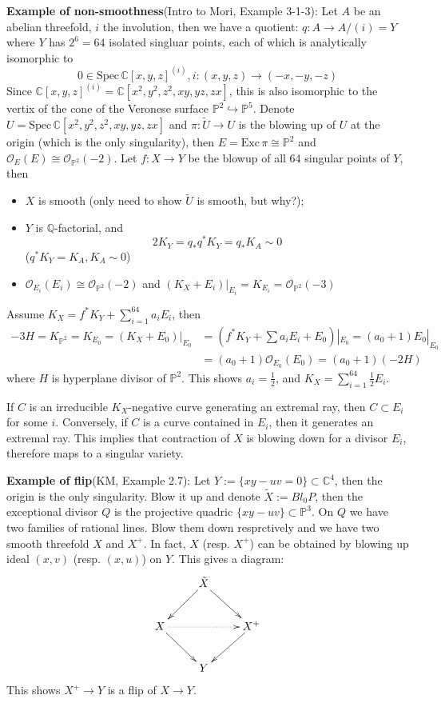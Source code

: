 \documentclass{article}
\begin{document}
\textbf{Example of non-smoothness}(Intro to Mori, Example 3-1-3): Let $ A $ be an abelian threefold, $ i $ the involution, then we have a quotient: $ q:A\to A/(i)=Y $ where $ Y $ has $ 2^6=64 $ isolated singluar points, each of which is analytically isomorphic to 
$$ 0\in \mathrm{Spec}\,\mathbb{C}[x,y,z]^{(i)}, i:(x,y,z)\to (-x,-y,-z) $$
Since $ \mathbb{C}[x,y,z]^{(i)}=\mathbb{C}[x^2,y^2,z^2,xy,yz,zx] $, this is also isomorphic to the vertix of the cone of the Veronese surface $ \mathbb{P}^2 \hookrightarrow \mathbb{P}^5$. Denote $ U=\mathrm{Spec}\,\mathbb{C}[x^2,y^2,z^2,xy,yz,zx] $ and $ \pi:\tilde{U}\to U $ is the blowing up of $ U $ at the origin (which is the only singularity), then $ E=\mathrm{Exc}\,\pi\cong \mathbb{P}^2 $ and $ \mathcal{O}_E(E)\cong \mathcal{O}_{\mathbb{P}^2}(-2) $. Let $ f:X\to Y $ be the blowup of all $ 64 $ singular points of $ Y $, then
\begin{itemize}
	\item $ X $ is smooth (only need to show $ \tilde{U} $ is smooth, but why?);
	\item $ Y $ is $ \mathbb{Q} $-factorial, and 
	$$ 2K_Y=q_*q^*K_Y=q_*K_A\sim 0$$
	($ q^*K_Y=K_A,K_A\sim 0 $)
	\item $ \mathcal{O}_{E_i}(E_i)\cong \mathcal{O}_{\mathbb{P}^2}(-2) $ and $ (K_X+E_i)|_{E_i}=K_{E_i}=\mathcal{O}_{\mathbb{P}^2}(-3) $
\end{itemize}
Assume $ K_X=f^*K_Y+\sum_{i=1}^{64}a_iE_i $, then 
\begin{equation*}
\begin{aligned}
-3H=K_{\mathbb{P}^2}=K_{E_0}=(K_X+E_0)|_{E_0}&=(f^*K_Y+\sum a_iE_i+E_0)|_{E_0}=(a_0+1)E_0|_{E_0}\\
&=(a_0+1)\mathcal{O}_{E_0}(E_0)=(a_0+1)(-2H)
\end{aligned}
\end{equation*}
 where $ H $ is hyperplane divisor of $ \mathbb{P}^2 $. This shows $ a_i =\frac{1}{2}$, and $ K_X=\sum_{i=1}^{64}\frac{1}{2}E_i $. 
 
If $ C $ is an irreducible $ K_X $-negative curve generating an extremal ray, then $ C\subset E_i $ for some $ i $. Conversely, if $ C $ is a curve contained in $ E_i $, then it generates an extremal ray. This implies that contraction of $ X $ is blowing down for a divisor $ E_i $, therefore maps to a singular variety.



\textbf{Example of flip}(KM, Example 2.7): Let $ Y:=\{ xy-uv=0 \}\subset \mathbb{C}^4 $, then the origin is the only singularity. Blow it up and denote $ \tilde{X}:=Bl_0P $, then the exceptional divisor $ Q $ is the projective quadric $ \{ xy-uv \}\subset \mathbb{P}^3 $. On $ Q $ we have two families of rational lines. Blow them down resprctively and we have two smooth threefold $ X $ and $ X^+ $. In fact, $ X $ (resp. $ X^+ $) can be obtained by blowing up ideal $ (x,v) $ (resp. $ (x,u) $) on $ Y $. This gives a diagram:
$$ \xymatrix{
	&\tilde{X}\ar[ld]\ar[rd]&\\
	X\ar[rd]\ar@{.>}[rr]&&X^+\ar[ld]\\
	&Y&
} $$ 
This shows $ X^+\to Y $ is a flip of $ X\to Y $.
\end{document}
